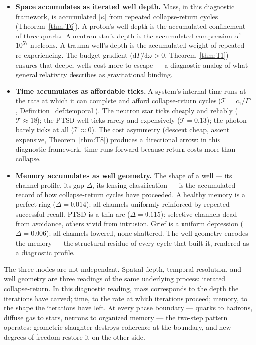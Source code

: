 \documentclass[
  aps,
  prd,
  twocolumn,
  superscriptaddress,
  nofootinbib,
  floatfix
]{revtex4-2}
\newcommand{\Gam}{\Gamma}
\newcommand{\dd}{\mathrm{d}}
\begin{document}
\begin{itemize}
\item \textbf{Space accumulates as iterated well depth.}
  Mass, in this diagnostic framework, is accumulated
  $|\kappa|$ from repeated collapse-return cycles
  (Theorem~\ref{thm:T6}).  A proton's well depth is the
  accumulated confinement of three quarks.  A neutron star's
  depth is the accumulated compression of $10^{57}$
  nucleons.  A trauma well's depth is the accumulated weight
  of repeated re-experiencing.  The budget gradient
  ($\dd\Gam/\dd\omega > 0$, Theorem~\ref{thm:T1}) ensures
  that deeper wells cost more to escape --- a diagnostic
  analog of what general relativity describes as
  gravitational binding.

\item \textbf{Time accumulates as affordable ticks.}
  A system's internal time runs at the rate at which it
  can complete and afford collapse-return cycles
  ($\mathcal{T} = c_1/\Gam'$, Definition~\ref{def:temporal}).
  The neutron star ticks cheaply and reliably
  ($\mathcal{T} \approx 18$); the PTSD well ticks rarely
  and expensively ($\mathcal{T} = 0.13$); the photon barely
  ticks at all ($\mathcal{T} \approx 0$).  The cost asymmetry
  (descent cheap, ascent expensive, Theorem~\ref{thm:T8})
  produces a directional arrow: in this diagnostic
  framework, time runs forward because return costs more
  than collapse.

\item \textbf{Memory accumulates as well geometry.}
  The shape of a well --- its channel profile, its gap
  $\Delta$, its lensing classification --- is the accumulated
  record of how collapse-return cycles have proceeded.  A
  healthy memory is a perfect ring ($\Delta = 0.014$): all
  channels uniformly reinforced by repeated successful
  recall.  PTSD is a thin arc ($\Delta = 0.115$): selective
  channels dead from avoidance, others vivid from intrusion.
  Grief is a uniform depression ($\Delta = 0.006$): all
  channels lowered, none shattered.  The well geometry
  encodes the memory --- the structural residue of every
  cycle that built it, rendered as a diagnostic profile.
\end{itemize}

The three modes are not independent.  Spatial depth,
temporal resolution, and well geometry are three readings of
the same underlying process: iterated collapse-return.  In
this diagnostic reading, mass corresponds to the depth the
iterations have carved; time, to the rate at which iterations
proceed; memory, to the shape the iterations have
left.  At every phase boundary --- quarks to hadrons,
diffuse gas to stars, neurons to organized memory --- the
two-step pattern operates: geometric slaughter destroys
coherence at the boundary, and new degrees of freedom
restore it on the other side.
\end{document}
